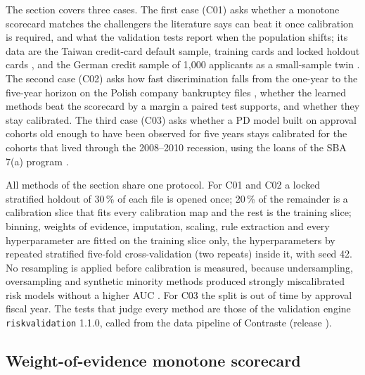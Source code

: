 The section covers three cases. The first case (C01) asks whether a monotone scorecard matches the challengers the literature says
can beat it once calibration is required, and what the validation tests report when the population shifts; its data are the
Taiwan credit-card default sample, \csFitTwTrain{} training cards and \csHoN{} locked holdout cards \citep{credit-scoring:yeh2009},
and the German credit sample of 1,000 applicants as a small-sample twin \citep{credit-scoring:hofmann1994}. The second case (C02)
asks how fast discrimination falls from the one-year to the five-year horizon on the Polish company bankruptcy files
\citep{credit-scoring:tomczak2016}, whether the learned methods beat the scorecard by a margin a paired test supports, and whether
they stay calibrated. The third case (C03) asks whether a PD model built on approval cohorts old enough to have been observed for
five years stays calibrated for the cohorts that lived through the 2008--2010 recession, using the loans of the SBA 7(a) program
\citep{credit-scoring:sbafoia}.

All methods of the section share one protocol. For C01 and C02 a locked stratified holdout of 30\,\% of each file is opened once;
20\,\% of the remainder is a calibration slice that fits every calibration map and the rest is the training slice; binning,
weights of evidence, imputation, scaling, rule extraction and every hyperparameter are fitted on the training slice only, the
hyperparameters by repeated stratified five-fold cross-validation (two repeats) inside it, with seed 42. No resampling is applied
before calibration is measured, because undersampling, oversampling and synthetic minority methods produced strongly
miscalibrated risk models without a higher AUC \citep{credit-scoring:goorbergh2022}. For C03 the split is out of time by approval
fiscal year. The tests that judge every method are those of the validation engine \texttt{riskvalidation} 1.1.0, called from the
data pipeline of Contraste (release \docversion{}).

\subsection{Weight-of-evidence monotone scorecard}
\label{sec:m1}

